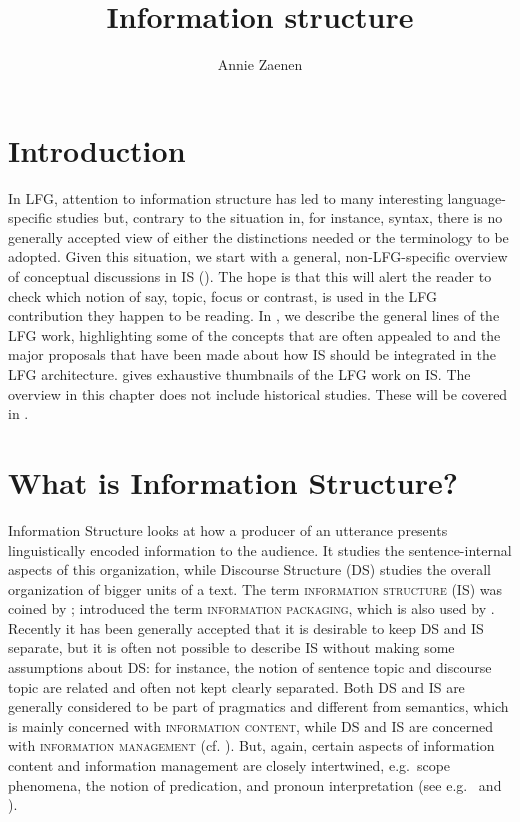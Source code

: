 \documentclass[output=paper,hidelinks]{langscibook}
\title{Information structure}
\author{Annie Zaenen\affiliation{Stanford University}}
\begin{document}
\maketitle
\label{chap:InformationStructure}

\largerpage
\section{Introduction}
In LFG, attention to information structure has led to many interesting lan\-guage-specific studies but, contrary to the situation in, for instance, syntax, there is no generally accepted view of either the distinctions needed or the terminology to be adopted. Given this situation, we start with a general, non-LFG-specific overview of conceptual discussions in IS (). The hope is that this will alert the reader to check which notion of say, topic, focus or contrast, is used in the LFG contribution they happen to be reading. In , we describe the general lines of the LFG work, highlighting some of the concepts that are often appealed to and the major proposals that have been made about how IS should be integrated in the LFG architecture.  gives exhaustive thumbnails of the LFG work on IS. The overview in this chapter does not include historical studies. These will be covered in .
\section{What is Information Structure?} \label{is} 

Information Structure looks at how a producer of an utterance presents linguistically encoded information to the audience. It studies the sentence-internal aspects of this organization, while Discourse Structure (DS) studies the overall organization of bigger units of a text. The term \textsc{information structure} (IS) was coined by \citet{Halliday1967}; \citet{Chafe1976} introduced the term \textsc{information packaging}, which is also used by \citet{Vallduvi}. Recently it has been generally accepted that it is desirable to keep DS and IS separate, but it is often not possible to describe IS without making some assumptions about DS: for instance, the notion of sentence topic and discourse topic are related and often not kept clearly separated. Both DS and IS are generally considered to be part of pragmatics and different from semantics, which is mainly concerned with \textsc{information content}, while DS and IS are concerned with \textsc{information management} (cf. \citealt{Krifka}). But, again, certain aspects of information content and information management are closely intertwined, e.g.\ scope phenomena, the notion of predication, and pronoun interpretation (see e.g.\ \citealt{Reinhart} and \citealt{kingzaenen}). 
\end{document}
